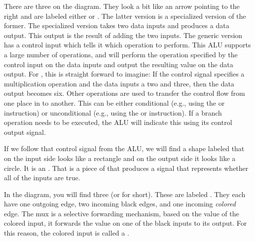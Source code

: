 There are three  on the diagram. They look a bit like an arrow pointing to the right and are labeled either  or \say{+}. The latter version is a specialized version of the former. The specialized version takes two data inputs and produces a data output. This output is the result of adding the two inputs. The generic version has a control input which tells it which operation to perform. This ALU supports a large number of operations, and will perform the operation specified by the control input on the data inputs and output the resulting value on the data output. For , this is straight forward to imagine: If the control signal specifies a multiplication operation and the data inputs a two and three, then the data output becomes six. Other operations are used to transfer the control flow from one place in  to another. This can be either conditional (e.g., using the  or  instruction) or unconditional (e.g., using the  or  instruction). If a branch operation needs to be executed, the ALU will indicate this using its control output signal.

If we follow that control signal from the ALU, we will find a shape labeled  that on the input side looks like a rectangle and on the output side it looks like a circle. It is an . That is a piece of  that produces a signal that represents whether all of the inputs are true.

In the diagram, you will find three  (or  for short). These are labeled . They each have one outgoing edge, two incoming black edges, and one incoming \textsl{colored} edge. The mux is a selective forwarding mechanism, based on the value of the colored input, it forwards the value on one of the black inputs to its output. For this reason, the colored input is called a .

